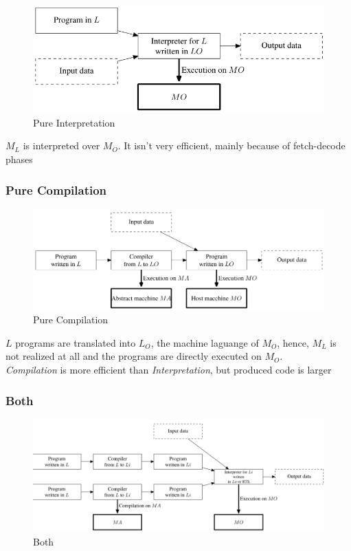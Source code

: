 \begin{figure}[htbp]
    \centering
    \includegraphics{images/am_pure_int.png}
    \caption{Pure Interpretation}
    \label{fig:am_pure_int.png}
\end{figure}

$M_L$ is interpreted over $M_O$.
It isn't very efficient, mainly because of fetch-decode phases

\subsubsection{Pure Compilation}

\begin{figure}[htbp]
    \centering
    \includegraphics{images/am_pure_comp.png}
    \caption{Pure Compilation}
    \label{fig:am_pure_comp.png}
\end{figure}

$L$ programs are translated into $L_O$, the machine laguange of $M_O$,
hence, $M_L$ is not realized at all and the programs are directly executed on $M_O$.\\
\textit{Compilation} is more efficient than \textit{Interpretation}, 
but produced code is larger

\subsubsection{Both}

\begin{figure}[htbp]
    \centering
    \includegraphics{images/am_both.png}
    \caption{Both}
    \label{fig:am_both}
\end{figure}

